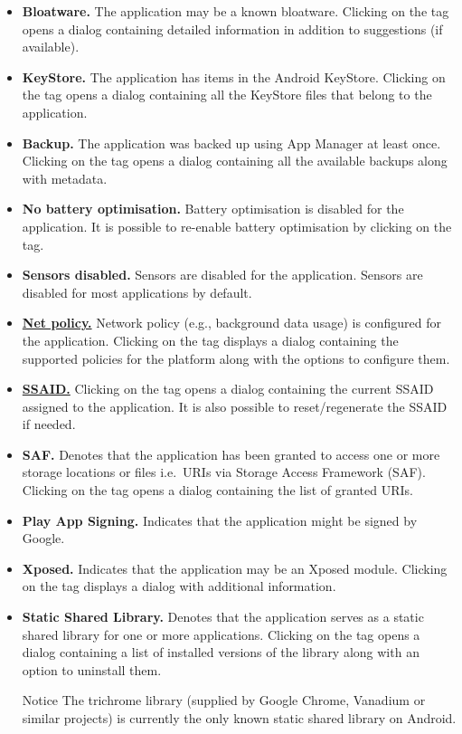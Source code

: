 \begin{itemize}
    \item \textbf{Bloatware.} The application may be a known bloatware. Clicking on the tag opens a
    dialog containing detailed information in addition to suggestions (if available).

    \item \textbf{KeyStore.} The application has items in the Android KeyStore. Clicking on the tag opens a dialog
    containing all the KeyStore files that belong to the application.

    \item \textbf{Backup.} The application was backed up using App Manager at least once. Clicking on the tag
    opens a dialog containing all the available backups along with metadata.

    \item \textbf{No battery optimisation.} Battery optimisation is disabled for the application. It is possible to
    re-enable battery optimisation by clicking on the tag.

    \item \textbf{Sensors disabled.} Sensors are disabled for the application. Sensors are disabled
    for most applications by default.

    \item \hyperref[sec:net-policy]{\textbf{Net policy.}} Network policy (e.g., background data usage) is configured
    for the application. Clicking on the tag displays a dialog containing the supported policies for the platform
    along with the options to configure them.

    \item \hyperref[sec:terminologies]{\textbf{SSAID.}} Clicking on the tag opens a dialog containing the current
    SSAID assigned to the application. It is also possible to reset/regenerate the SSAID if needed.

    \item \textbf{SAF.} Denotes that the application has been granted to access one or more storage locations or
    files i.e.\ URIs via Storage Access Framework (SAF). Clicking on the tag opens a dialog containing the list of
    granted URIs.

    \item \textbf{Play App Signing.} Indicates that the application might be signed by Google.

    \item \textbf{Xposed.} Indicates that the application may be an Xposed module. Clicking on the
    tag displays a dialog with additional information.

    \item \textbf{Static Shared Library.} Denotes that the application serves as a static shared
    library for one or more applications. Clicking on the tag opens a dialog containing a list of
    installed versions of the library along with an option to uninstall them.
    \begin{tip}{Notice}
        The trichrome library (supplied by Google Chrome, Vanadium or similar projects) is currently
        the only known static shared library on Android.
    \end{tip}
\end{itemize}

